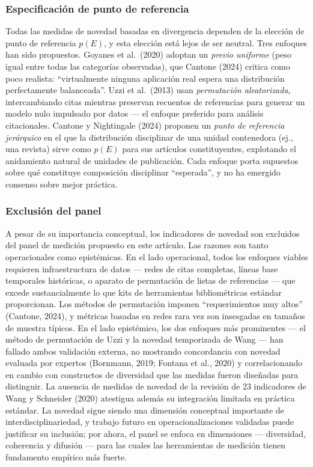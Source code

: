 \documentclass[
]{article}
\begin{document}
\hypertarget{especificaciuxf3n-de-punto-de-referencia}{%
\subsubsection{Especificación de punto de
referencia}\label{especificaciuxf3n-de-punto-de-referencia}}

Todas las medidas de novedad basadas en divergencia dependen de la
elección de punto de referencia \(p(E)\), y esta elección está lejos de
ser neutral. Tres enfoques han sido propuestos. Goyanes et al.~(2020)
adoptan un \emph{previo uniforme} (peso igual entre todas las categorías
observadas), que Cantone (2024) critica como poco realista:
``virtualmente ninguna aplicación real espera una distribución
perfectamente balanceada''. Uzzi et al.~(2013) usan \emph{permutación
aleatorizada}, intercambiando citas mientras preservan recuentos de
referencias para generar un modelo nulo impulsado por datos --- el
enfoque preferido para análisis citacionales. Cantone y Nightingale
(2024) proponen un \emph{punto de referencia jerárquico} en el que la
distribución disciplinar de una unidad contenedora (ej., una revista)
sirve como \(p(E)\) para sus artículos constituyentes, explotando el
anidamiento natural de unidades de publicación. Cada enfoque porta
supuestos sobre qué constituye composición disciplinar ``esperada'', y
no ha emergido consenso sobre mejor práctica.

\hypertarget{exclusiuxf3n-del-panel}{%
\subsubsection{Exclusión del panel}\label{exclusiuxf3n-del-panel}}

A pesar de su importancia conceptual, los indicadores de novedad son
excluidos del panel de medición propuesto en este artículo. Las razones
son tanto operacionales como epistémicas. En el lado operacional, todos
los enfoques viables requieren infraestructura de datos --- redes de
citas completas, líneas base temporales históricas, o aparato de
permutación de listas de referencias --- que excede sustancialmente lo
que kits de herramientas bibliométricas estándar proporcionan. Los
métodos de permutación imponen ``requerimientos muy altos'' (Cantone,
2024), y métricas basadas en redes rara vez son insesgadas en tamaños de
muestra típicos. En el lado epistémico, los dos enfoques más prominentes
--- el método de permutación de Uzzi y la novedad temporizada de Wang
--- han fallado ambos validación externa, no mostrando concordancia con
novedad evaluada por expertos (Bornmann, 2019; Fontana et al., 2020) y
correlacionando en cambio con constructos de diversidad que las medidas
fueron diseñadas para distinguir. La ausencia de medidas de novedad de
la revisión de 23 indicadores de Wang y Schneider (2020) atestigua
además su integración limitada en práctica estándar. La novedad sigue
siendo una dimensión conceptual importante de interdisciplinariedad, y
trabajo futuro en operacionalizaciones validadas puede justificar su
inclusión; por ahora, el panel se enfoca en dimensiones --- diversidad,
coherencia y difusión --- para las cuales las herramientas de medición
tienen fundamento empírico más fuerte.
\end{document}

